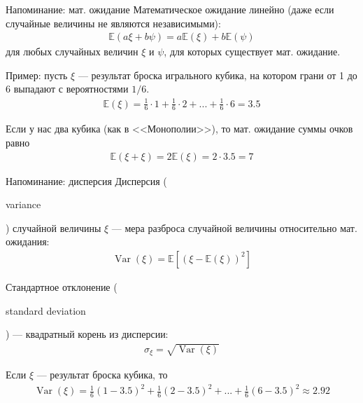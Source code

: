\documentclass{beamer}
\newcommand{\en}[1]{\begin{otherlanguage}{english}#1\end{otherlanguage}}
\begin{document}
\begin{frame}{Напоминание: мат. ожидание}
\justify
Математическое ожидание линейно (даже если случайные величины не являются независимыми):
\begin{align*}
\mathbb{E}(a\xi + b\psi) = a\mathbb{E}(\xi) + b\mathbb{E}(\psi)
\end{align*}
для любых случайных величин $\xi$ и $\psi$, для которых существует мат. ожидание.

\justify
Пример: пусть $\xi$ --- результат броска игрального кубика, на котором грани от 1 до 6 выпадают с вероятностями $1/6$.
\begin{align*}
\mathbb{E}(\xi) = \frac{1}{6} \cdot 1 + \frac{1}{6} \cdot 2 + ... + \frac{1}{6} \cdot 6 = 3.5
\end{align*}

\justify
Если у нас два кубика (как в <<Монополии>>), то мат. ожидание суммы очков равно
\begin{align*}
\mathbb{E}(\xi + \xi) = 2\mathbb{E}(\xi) = 2 \cdot 3.5 = 7
\end{align*}
\end{frame}



\begin{frame}{Напоминание: дисперсия}
\justify
\alert{Дисперсия} (\en{variance}) случайной величины $\xi$ --- мера разброса случайной величины относительно мат. ожидания:
\begin{align*}
\operatorname{Var}(\xi) = \mathbb{E}[(\xi - \mathbb{E}(\xi))^2]
\end{align*}

\justify
\alert{Стандартное отклонение} (\en{standard deviation}) --- квадратный корень из дисперсии:
\begin{align*}
\sigma_{\xi} = \sqrt{\operatorname{Var}(\xi)}
\end{align*}

\justify
Если $\xi$ --- результат броска кубика, то
\begin{align*}
\operatorname{Var}(\xi) = \frac{1}{6}(1 - 3.5)^2 + \frac{1}{6}(2 - 3.5)^2 + ... + \frac{1}{6}(6-3.5)^2 \approx 2.92
\end{align*}
\end{frame}
\end{document}

